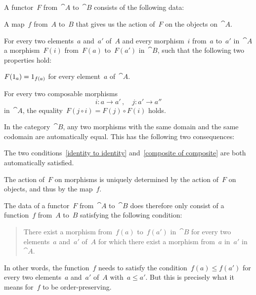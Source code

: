 \subsection{}

A functor~$F$ from~$\cat{A}$ to~$\cat{B}$ consists of the following data:
\begin{itemize*}
	\item
		A map~$f$ from~$A$ to~$B$ that gives us the action of~$F$ on the objects on~$\cat{A}$.
	\item
		For every two elements~$a$ and~$a'$ of~$A$ and every morphism~$i$ from~$a$ to~$a'$ in~$\cat{A}$ a morphism~$F(i)$ from~$F(a)$ to~$F(a')$ in~$\cat{B}$, such that the following two properties hold:
		\begin{enumerate*}
			\item
				\label{identity to identity}
				$F(1_a) = 1_{f(a)}$ for every element~$a$ of~$\cat{A}$.
			\item
				\label{composite of composite}
				For every two composable morphisms
				\[
					i \colon a \to a' \,,
					\quad
					j \colon a' \to a''
				\]
				in~$\cat{A}$, the equality~$F(j ∘ i) = F(j) ∘ F(i)$ holds.
		\end{enumerate*}
\end{itemize*}

In the category~$\cat{B}$, any two morphisms with the same domain and the same co\-domain are automatically equal.
This has the following two consequences:
\begin{itemize*}

	\item
		The two conditions~\ref{identity to identity} and~\ref{composite of composite} are both automatically satisfied.

	\item
		The action of~$F$ on morphisms is uniquely determined by the action of~$F$ on objects, and thus by the map~$f$.

\end{itemize*}

The data of a functor~$F$ from~$\cat{A}$ to~$\cat{B}$ does therefore only consist of a function~$f$ from~$A$ to~$B$ satisfying the following condition:
\begin{quote}
	There exist a morphism from~$f(a)$ to~$f(a')$ in~$\cat{B}$ for every two elements~$a$ and~$a'$ of~$A$ for which there exist a morphism from~$a$ in~$a'$ in~$\cat{A}$.
\end{quote}
In other words, the function~$f$ needs to satisfy the condition~$f(a) ≤ f(a')$ for every two elements~$a$ and~$a'$ of~$A$ with~$a ≤ a'$.
But this is precisely what it means for~$f$ to be order-preserving.
